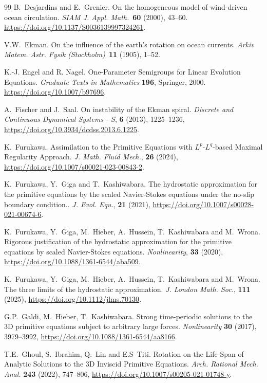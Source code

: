 \documentclass[preprint]{elsarticle}
\numberwithin{equation}{section}
\begin{document}
\begin{thebibliography}{99}
	B.~Desjardins and E.~Grenier. 
	On the homogeneous model of wind-driven ocean circulation.
	\textit{SIAM J. Appl. Math.}~\textbf{60} (2000), 43--60.
	\url{https://doi.org/10.1137/S0036139997324261}.
	
	V.W.~Ekman. 
	On the influence of the earth's rotation on ocean currents.
	\textit{Arkiv Matem. Astr. Fysik (Stockholm)}~\textbf{11} (1905), 1--52.
	
	K.-J. Engel and R. Nagel. 
	One-Parameter Semigroups for Linear Evolution Equations.
	\textit{Graduate Texts in Mathematics } \textbf{196}, {Springer}, 2000.
	{\url{https://doi.org/10.1007/b97696}}.
	
	A.~Fischer and J.~Saal.
	On instability of the Ekman spiral.
	{\em Discrete and Continuous Dynamical Systems - S}, \textbf{6} (2013), 1225--1236,
	\url{https://doi.org/10.3934/dcdss.2013.6.1225}.
	
	K.~Furukawa.
	Assimilation to the Primitive Equations with 
	$L^p$-$L^q$-based Maximal Regularity Approach.
	{\em  J. Math. Fluid Mech.}, \textbf{26} (2024),
	\url{https://doi.org/10.1007/s00021-023-00843-2}.
	
	K.~Furukawa, Y.~Giga and T.~Kashiwabara.
	The hydrostatic approximation for the primitive equations by the scaled Navier-Stokes equations under the no-slip boundary condition..
	{\em  J. Evol. Equ.}, \textbf{21} (2021),
	\url{https://doi.org/10.1007/s00028-021-00674-6}.
	
	K.~Furukawa, Y.~Giga, M.~Hieber, A.~Hussein, T.~Kashiwabara and M.~Wrona.
	Rigorous justification of the hydrostatic approximation for the primitive equations by scaled Navier-Stokes equations.
	{\em  Nonlinearity}, \textbf{33} (2020),
	\url{https://doi.org/10.1088/1361-6544/aba509}.
	
	K.~Furukawa, Y.~Giga, M.~Hieber, A.~Hussein, T.~Kashiwabara and M.~Wrona.
	The three limits of the hydrostatic approximation.
	{\em  J. London Math. Soc.}, \textbf{111} (2025),
	\url{https://doi.org/10.1112/jlms.70130}.
	
	G.P.~Galdi, M.~Hieber, T.~Kashiwabara.
	Strong time-periodic solutions to the 3D primitive equations subject to arbitrary large forces.
	\textit{Nonlinearity} \textbf{30} (2017), 3979--3992,
	\url{https://doi.org/10.1088/1361-6544/aa8166}.
	
	
	T.E.~Ghoul, S.~Ibrahim, Q.~Lin and E.S~Titi.
	Rotation on the Life-Span of Analytic Solutions to the 3D Inviscid Primitive Equations.
	\textit{Arch. Rational Mech. Anal.} \textbf{243} (2022), 747--806,
	\url{https://doi.org/10.1007/s00205-021-01748-y}.
	

\end{thebibliography}
\end{document}
